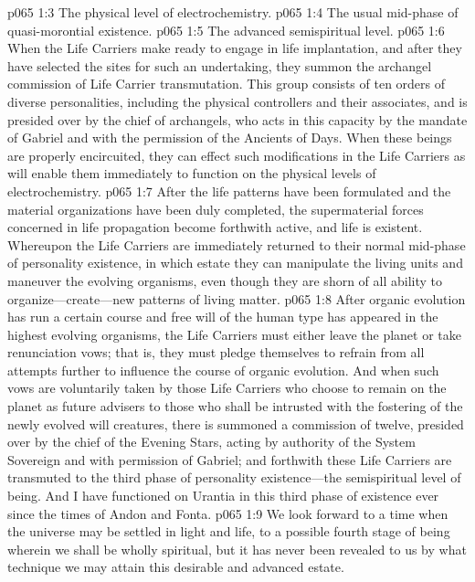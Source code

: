 \pc \vs p065 1:3 \bibnobreakspace The physical level of electrochemistry.
\vs p065 1:4 \bibnobreakspace The usual mid\hyp{}phase of quasi\hyp{}morontial existence.
\vs p065 1:5 \bibnobreakspace The advanced semispiritual level.
\pc \vs p065 1:6 When the Life Carriers make ready to engage in life implantation, and after they have selected the sites for such an undertaking, they summon the archangel commission of Life Carrier transmutation. This group consists of ten orders of diverse personalities, including the physical controllers and their associates, and is presided over by the chief of archangels, who acts in this capacity by the mandate of Gabriel and with the permission of the Ancients of Days. When these beings are properly encircuited, they can effect such modifications in the Life Carriers as will enable them immediately to function on the physical levels of electrochemistry.\plusone
\vs p065 1:7 After the life patterns have been formulated and the material organizations have been duly completed, the supermaterial forces concerned in life propagation become forthwith active, and life is existent. Whereupon the Life Carriers are immediately returned to their normal mid\hyp{}phase of personality existence, in which estate they can manipulate the living units and maneuver the evolving organisms, even though they are shorn of all ability to organize---create---new patterns of living matter.
\vs p065 1:8 After organic evolution has run a certain course and free will of the human type has appeared in the highest evolving organisms, the Life Carriers must either leave the planet or take renunciation vows; that is, they must pledge themselves to refrain from all attempts further to influence the course of organic evolution. And when such vows are voluntarily taken by those Life Carriers who choose to remain on the planet as future advisers to those who shall be intrusted with the fostering of the newly evolved will creatures, there is summoned a commission of twelve, presided over by the chief of the Evening Stars, acting by authority of the System Sovereign and with permission of Gabriel; and forthwith these Life Carriers are transmuted to the third phase of personality existence---the semispiritual level of being. And I have functioned on Urantia in this third phase of existence ever since the times of Andon and Fonta.\plusone
\vs p065 1:9 We look forward to a time when the universe may be settled in light and life, to a possible fourth stage of being wherein we shall be wholly spiritual, but it has never been revealed to us by what technique we may attain this desirable and advanced estate.
